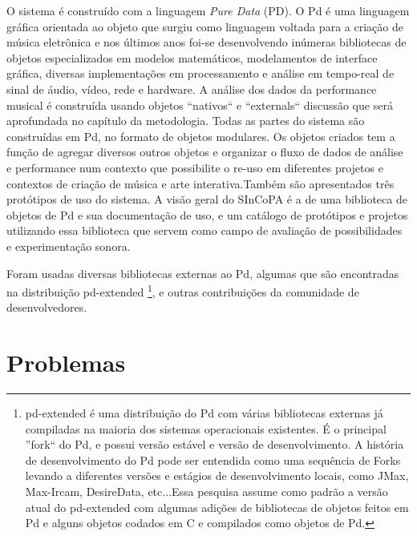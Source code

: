\documentclass[draft]{ppgmus}
\newcommand{\pd}{PD}
\begin{document}
O sistema é construído com a linguagem \textit{Pure Data} (\pd). O Pd é uma linguagem gráfica orientada ao objeto que surgiu
como linguagem voltada para a criação de música eletrônica e nos últimos anos foi-se desenvolvendo inúmeras
bibliotecas de objetos especializados em modelos matemáticos, modelamentos de interface gráfica, diversas 
implementações
em processamento e análise em tempo-real de sinal de áudio, vídeo, rede e hardware. 
A análise dos dados da performance musical é construída usando objetos ``nativos`` e ``externals`` 
discussão que será
aprofundada no capítulo da metodologia. 
Todas as partes do sistema são construídas em Pd, no formato de objetos
modulares. Os objetos criados tem a função de agregar diversos outros objetos e organizar o fluxo de dados
de análise e performance num contexto que possibilite o re-uso em diferentes projetos e contextos de 
criação de música e arte interativa.Também são apresentados três protótipos de uso do sistema. A visão geral do
SInCoPA é a de uma biblioteca de objetos de Pd e sua documentação de uso, e um catálogo de protótipos e projetos
utilizando essa biblioteca que servem como campo de avaliação de possibilidades e experimentação sonora.


Foram usadas diversas bibliotecas externas ao Pd, algumas que são encontradas na distribuição pd-extended
\footnote{pd-extended é uma distribuição do Pd com várias bibliotecas externas já compiladas na maioria dos
sistemas operacionais existentes. É o principal ''fork`` do Pd, e possui versão estável e versão de desenvolvimento.
A história de desenvolvimento do Pd pode ser entendida como uma sequência de Forks levando a diferentes versões 
e estágios de desenvolvimento locais, como JMax, Max-Ircam, DesireData, etc...Essa pesquisa assume como padrão
a versão atual do pd-extended com algumas adições de bibliotecas de objetos feitos em Pd e alguns objetos codados
em C e compilados como objetos de Pd.}, 
e outras contribuições da comunidade de desenvolvedores.

\section{Problemas}

\end{document}
